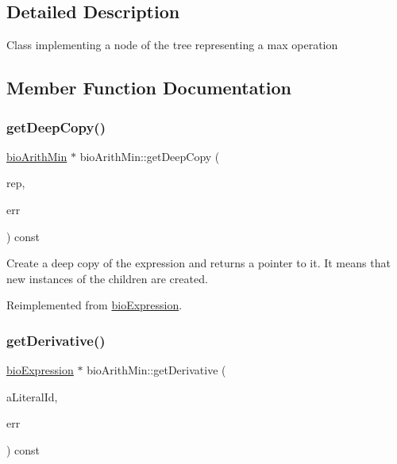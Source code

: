 \subsection{Detailed Description}
Class implementing a node of the tree representing a max operation 

\subsection{Member Function Documentation}
\mbox{\label{classbio_arith_min_a2d083461d7be9f1c5abac00fe4066a37}} 
\subsubsection{\texorpdfstring{get\+Deep\+Copy()}{getDeepCopy()}}
{\footnotesize\ttfamily \hyperlink{classbio_arith_min}{bio\+Arith\+Min} $\ast$ bio\+Arith\+Min\+::get\+Deep\+Copy (\begin{DoxyParamCaption}\item[{\hyperlink{classbio_expression_repository}{bio\+Expression\+Repository} $\ast$}]{rep,  }\item[{pat\+Error $\ast$\&}]{err }\end{DoxyParamCaption}) const\hspace{0.3cm}{\ttfamily [virtual]}}

Create a deep copy of the expression and returns a pointer to it. It means that new instances of the children are created. 

Reimplemented from \hyperlink{classbio_expression_a4ee1b8add634078a02eaae26cd40dcc8}{bio\+Expression}.

\mbox{\label{classbio_arith_min_a385882099c9d71855493b6aa4b6223e1}} 
\subsubsection{\texorpdfstring{get\+Derivative()}{getDerivative()}}
{\footnotesize\ttfamily \hyperlink{classbio_expression}{bio\+Expression} $\ast$ bio\+Arith\+Min\+::get\+Derivative (\begin{DoxyParamCaption}\item[{pat\+U\+Long}]{a\+Literal\+Id,  }\item[{pat\+Error $\ast$\&}]{err }\end{DoxyParamCaption}) const\hspace{0.3cm}{\ttfamily [virtual]}}

